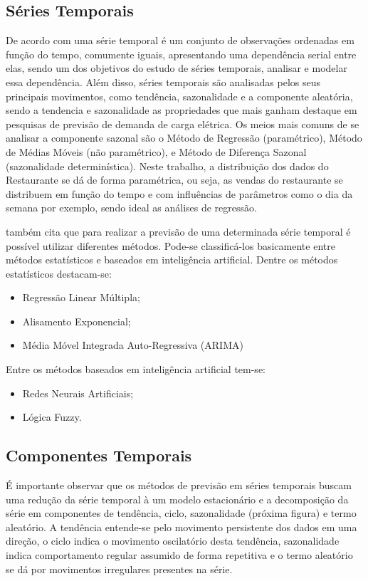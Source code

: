 \documentclass[	12pt, Times, openright, twoside, a4paper, english, brazil]{abntex2}
\begin{document}
        \subsection{Séries Temporais}
          De acordo com  \cite{Morettin1987} uma série temporal é um conjunto de observações ordenadas em função do tempo, comumente iguais, apresentando uma dependência serial entre elas, sendo um dos objetivos do estudo de séries temporais, analisar e modelar essa dependência. Além disso, séries temporais são analisadas pelos seus principais movimentos, como tendência, sazonalidade e a componente aleatória, sendo a tendencia e sazonalidade as propriedades que mais ganham destaque em pesquisas de previsão de demanda de carga elétrica. Os meios mais comuns de se analisar a componente sazonal são o Método de Regressão (paramétrico), Método de Médias Móveis (não paramétrico), e Método de Diferença Sazonal (sazonalidade determinística).  Neste trabalho, a distribuição dos dados do Restaurante se dá de forma paramétrica, ou seja, as vendas do restaurante se distribuem em função do tempo e com influências de parâmetros como o dia da semana por exemplo, sendo ideal as análises de regressão. 

          \cite{Almeida2013} também cita que para realizar a previsão de uma determinada série temporal é possível utilizar diferentes métodos. Pode-se classificá-los basicamente entre métodos estatísticos e baseados em inteligência artificial.
          Dentre os métodos estatísticos destacam-se:
          \begin{itemize}
          \item Regressão Linear Múltipla;
          \item Alisamento Exponencial;
          \item Média Móvel Integrada Auto-Regressiva (ARIMA)
          \end{itemize}
          Entre os métodos baseados em inteligência artificial tem-se:
          \begin{itemize}
          \item Redes Neurais Artificiais;
          \item Lógica Fuzzy.
          \end{itemize}

        \subsection{Componentes Temporais}

          É importante observar que os métodos de previsão em séries temporais buscam uma redução da série temporal à um modelo estacionário e a decomposição da série em componentes de tendência, ciclo, sazonalidade (próxima figura) e termo aleatório. A tendência entende-se pelo movimento persistente dos dados em uma direção, o ciclo indica o movimento oscilatório desta tendência, sazonalidade indica comportamento regular assumido de forma repetitiva e o termo aleatório se dá por movimentos irregulares presentes na série.
           
\end{document}
